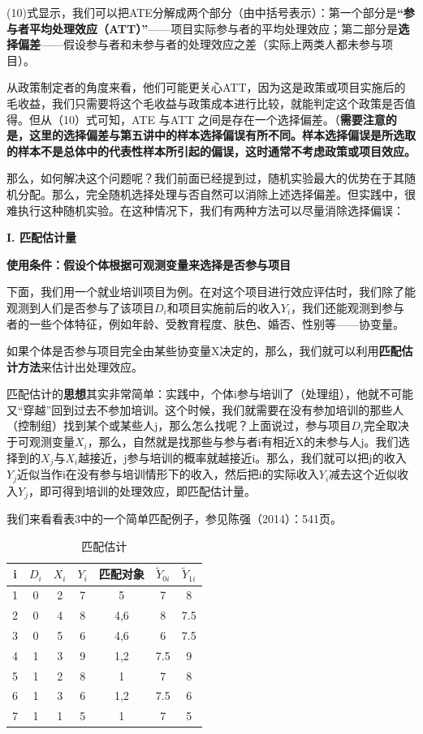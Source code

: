 \documentclass[cn,12pt,math=newtx,citestyle=gb7714-2015,bibstyle=gb7714-2015]{elegantbook}
\begin{document}
	(10)式显示，我们可以把ATE分解成两个部分（由中括号表示）：第一个部分是\textbf{“参与者平均处理效应（ATT）”}——项目实际参与者的平均处理效应；第二部分是\textbf{选择偏差}——假设参与者和未参与者的处理效应之差（实际上两类人都未参与项目）。
	
	从政策制定者的角度来看，他们可能更关心ATT，因为这是政策或项目实施后的毛收益，我们只需要将这个毛收益与政策成本进行比较，就能判定这个政策是否值得。但从（10）式可知，ATE 与ATT 之间是存在一个选择偏差。（\textbf{需要注意的是，这里的选择偏差与第五讲中的样本选择偏误有所不同。样本选择偏误是所选取的样本不是总体中的代表性样本所引起的偏误，这时通常不考虑政策或项目效应。}
	
	那么，如何解决这个问题呢？我们前面已经提到过，随机实验最大的优势在于其随机分配。那么，完全随机选择处理与否自然可以消除上述选择偏差。但实践中，很难执行这种随机实验。在这种情况下，我们有两种方法可以尽量消除选择偏误：
	
	\textbf{I. 匹配估计量}
	
	\textbf{使用条件：假设个体根据可观测变量来选择是否参与项目}
	
	下面，我们用一个就业培训项目为例。在对这个项目进行效应评估时，我们除了能观测到人们是否参与了该项目$D_i$和项目实施前后的收入$Y_i$，我们还能观测到参与者的一些个体特征，例如年龄、受教育程度、肤色、婚否、性别等——协变量。
	
	如果个体是否参与项目完全由某些协变量X决定的，那么，我们就可以利用\textbf{匹配估计方法}来估计出处理效应。
	
	匹配估计的\textbf{思想}其实非常简单：实践中，个体i参与培训了（处理组），他就不可能又“穿越”回到过去不参加培训。这个时候，我们就需要在没有参加培训的那些人（控制组）找到某个或某些人j，那么怎么找呢？上面说过，参与项目$D_i$完全取决于可观测变量$X_i$，那么，自然就是找那些与参与者i有相近X的未参与人j。我们选择到的$X_j$与$X_i$越接近，j参与培训的概率就越接近i。那么，我们就可以把j的收入$Y_j$近似当作i在没有参与培训情形下的收入，然后把i的实际收入$Y_i$减去这个近似收入$Y_j$，即可得到培训的处理效应，即匹配估计量。
	
	我们来看看表3中的一个简单匹配例子，参见陈强（2014）：541页。
	
	\begin{center}
		\begin{table}[!h]
			\caption{匹配估计}\label{tab:digit}
			\begin{center}
				\begin{tabular}{c|c|c|c|c|c|c}
					\hline
					i&$D_i$&$X_i$&$Y_i$&匹配对象&$\tilde{Y}_{0i}$&$\tilde{Y}_{1i}$\\
					\hline
					1&0&2&7&{5}&7&8\\
					\hline
					2&0&4&8&{4,6}&8&7.5\\
					\hline
					3&0&5&6&{4,6}&6&7.5\\
					\hline
					4&1&3&9&{1,2}&7.5&9\\
					\hline
					5&1&2&8&{1}&7&8\\
					\hline
					6&1&3&6&{1,2}&7.5&6\\
					\hline
					7&1&1&5&{1}&7&5\\
					\hline
				\end{tabular}
			\end{center}
		\end{table}
	\end{center}
	
\end{document}
